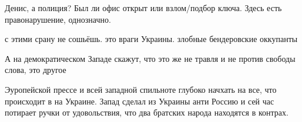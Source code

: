 \begin{itemize}
Денис, а полиция?
Был ли офис открыт или взлом/подбор ключа. Здесь есть правонарушение, однозначно.

 
с этими срану не сошьёшь. это враги Украины. злобные бендеровские оккупанты

 
А на демократическом Западе скажут, что это же не травля и не против свободы слова, это другое

 
Эуропейской прессе и всей западной спильноте глубоко начхать на все, что
происходит в на Украине. Запад сделал из Украины анти Россию и сей час потирает
ручки от удовольствия, что два братских народа находятся в контрах.
 
\end{itemize}

